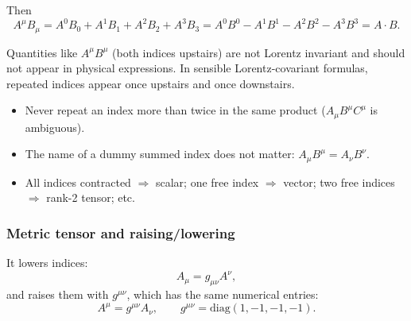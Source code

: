 
Then
\begin{equation}
  A^\mu B_\mu
  = A^0B_0 + A^1B_1 + A^2B_2 + A^3B_3
  = A^0B^0 - A^1B^1 - A^2B^2 - A^3B^3
  = A\cdot B.
  \label{eq:lec02:einstein-dot}
\end{equation}

\begin{remark}
Quantities like \(A^\mu B^\mu\) (both indices upstairs) are not Lorentz
invariant and should not appear in physical expressions. In sensible
Lorentz-covariant formulas, repeated indices appear once upstairs and
once downstairs.
\end{remark}

\begin{remark}
\begin{itemize}
  \item Never repeat an index more than twice in the same product
    (\(A_\mu B^\mu C^\mu\) is ambiguous).
  \item The name of a dummy summed index does not matter:
    \(A_\mu B^\mu = A_\nu B^\nu\).
  \item All indices contracted \(\Rightarrow\) scalar; one free index
    \(\Rightarrow\) vector; two free indices \(\Rightarrow\) rank-2
    tensor; etc.
\end{itemize}
\end{remark}

\subsubsection*{Metric tensor and raising/lowering}


It lowers indices:
\begin{equation}
  A_\mu = g_{\mu\nu}A^\nu,
  \label{eq:lec02:lowering}
\end{equation}
and raises them with \(g^{\mu\nu}\), which has the same numerical
entries:
\begin{equation}
  A^\mu = g^{\mu\nu}A_\nu,
  \qquad g^{\mu\nu}=\mathrm{diag}(1,-1,-1,-1).
  \label{eq:lec02:raising}
\end{equation}

